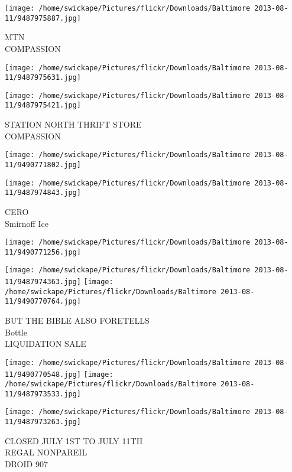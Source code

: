\documentclass[10pt,letterpaper]{article}
\begin{document}
\vspace{0.25in}
\texttt{[image: /home/swickape/Pictures/flickr/Downloads/Baltimore 2013-08-11/9487975887.jpg]}

MTN\\
COMPASSION\\
\pagebreak

\texttt{[image: /home/swickape/Pictures/flickr/Downloads/Baltimore 2013-08-11/9487975631.jpg]}

\vspace{0.25in}
\texttt{[image: /home/swickape/Pictures/flickr/Downloads/Baltimore 2013-08-11/9487975421.jpg]}

STATION NORTH THRIFT STORE\\
COMPASSION\\
\pagebreak

\texttt{[image: /home/swickape/Pictures/flickr/Downloads/Baltimore 2013-08-11/9490771802.jpg]}

\vspace{0.25in}
\texttt{[image: /home/swickape/Pictures/flickr/Downloads/Baltimore 2013-08-11/9487974843.jpg]}

CERO\\
Smirnoff Ice\\
\pagebreak

\texttt{[image: /home/swickape/Pictures/flickr/Downloads/Baltimore 2013-08-11/9490771256.jpg]}

\vspace{0.25in}
\texttt{[image: /home/swickape/Pictures/flickr/Downloads/Baltimore 2013-08-11/9487974363.jpg]}
\texttt{[image: /home/swickape/Pictures/flickr/Downloads/Baltimore 2013-08-11/9490770764.jpg]}

BUT THE BIBLE ALSO FORETELLS\\
Bottle\\
LIQUIDATION SALE\\
\pagebreak

\texttt{[image: /home/swickape/Pictures/flickr/Downloads/Baltimore 2013-08-11/9490770548.jpg]}
\texttt{[image: /home/swickape/Pictures/flickr/Downloads/Baltimore 2013-08-11/9487973533.jpg]}

\vspace{0.25in}
\texttt{[image: /home/swickape/Pictures/flickr/Downloads/Baltimore 2013-08-11/9487973263.jpg]}

CLOSED JULY 1ST TO JULY 11TH\\
REGAL NONPAREIL\\
DROID 907\\
\pagebreak
\end{document}

